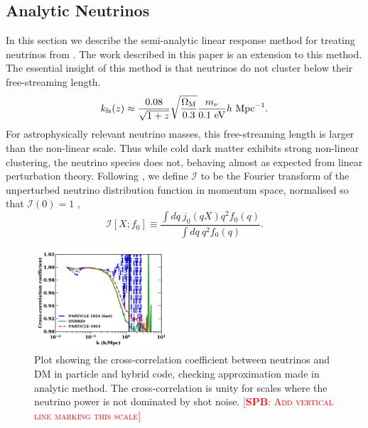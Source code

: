 \documentclass[useAMS, usenatbib]{mnras}
\newcommand{\spb}[1]{{\textsc{\textcolor{red}{[{\bf SPB}: #1]}}}}
\begin{document}
\subsection{Analytic Neutrinos}
\label{sec:analytic}

In this section we describe the semi-analytic linear response method for treating neutrinos from \cite{AHB}.
The work described in this paper is an extension to this method. The essential insight of this method is that
neutrinos do not cluster below their free-streaming length.
\begin{equation}
 k_{\rm fs}(z) \approx \frac{0.08}{\sqrt{1+z}}
\sqrt{\frac{\Omega_{\rm M}}{0.3}} \frac{m_{\nu}}{0.1 ~ \textrm{eV}} h~ \textrm{Mpc}^{-1}.  \label{eq:kfs}
\end{equation}
For astrophysically relevant neutrino masses, this free-streaming length is larger than the non-linear scale.
Thus while cold dark matter exhibits strong non-linear clustering, the neutrino species does not, behaving
almost as expected from linear perturbation theory. Following \cite{AHB}, we define $\mathcal{I}$ to
be the Fourier transform of the unperturbed neutrino distribution function in momentum space, normalised so
that $\mathcal{I}(0) = 1$ \citep{Brandenberger_1987, Bertschinger_Watts_1988},
\begin{equation}
\mathcal{I}[X; f_0] \equiv \frac{\int dq~ j_0(q X) q^2 f_0(q) }{\int dq ~q^2 f_0(q)}. \label{eq:I.def}
\end{equation}

\begin{figure}
\includegraphics[width=0.45\textwidth]{nuplots/corr_coeff-1.pdf}
  \caption{Plot showing the cross-correlation coefficient between neutrinos
  and DM in particle and hybrid code, checking approximation made in analytic method.
  The cross-correlation is unity for scales where the neutrino power is not dominated by shot noise.
  \spb{Add vertical line marking this scale}
  }
  \label{fig:cross-corr}
\end{figure}
\end{document}
